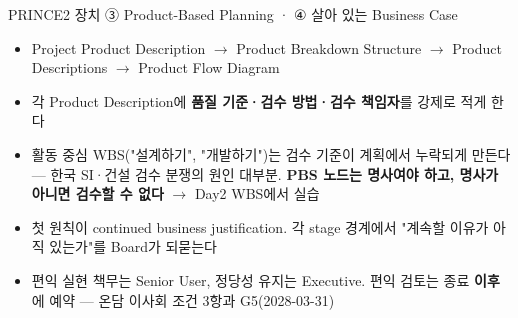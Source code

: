 \begin{frame}[allowframebreaks=1.0]{PRINCE2 장치 ③ Product-Based Planning · ④ 살아 있는 Business Case}
\small
\par\smallskip{}\nobreak
\begin{itemize}
\item\relax Project Product Description $\rightarrow$ Product Breakdown Structure $\rightarrow$ Product Descriptions $\rightarrow$ Product Flow Diagram
\item\relax 각 Product Description에 \textbf{품질 기준·검수 방법·검수 책임자}를 강제로 적게 한다
\item\relax 활동 중심 WBS("설계하기", "개발하기")는 검수 기준이 계획에서 누락되게 만든다 — 한국 SI·건설 검수 분쟁의 원인 대부분. \textbf{PBS 노드는 명사여야 하고, 명사가 아니면 검수할 수 없다} $\rightarrow$ Day2 WBS에서 실습
\end{itemize}
\par\smallskip{}\nobreak
\begin{itemize}
\item\relax 첫 원칙이 continued business justification. 각 stage 경계에서 "계속할 이유가 아직 있는가"를 Board가 되묻는다
\item\relax 편익 실현 책무는 Senior User, 정당성 유지는 Executive. 편익 검토는 종료 \textbf{이후}에 예약 — 온담 이사회 조건 3항과 G5(2028-03-31)
\end{itemize}
\par\smallskip{}\nobreak
{}
\end{frame}


